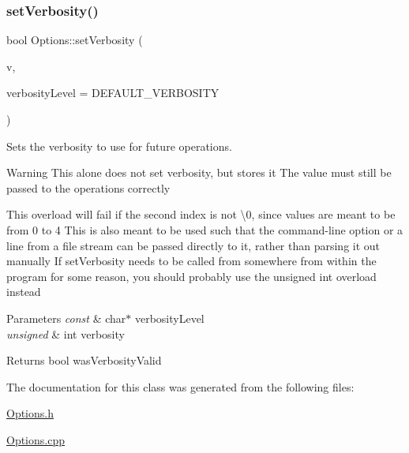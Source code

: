 \subsubsection{\texorpdfstring{setVerbosity()}{setVerbosity()}\hspace{0.1cm}{\footnotesize\ttfamily [4/4]}}
{\footnotesize\ttfamily bool Options\+::set\+Verbosity (\begin{DoxyParamCaption}\item[{const char $\ast$}]{v,  }\item[{unsigned int}]{verbosity\+Level = {\ttfamily DEFAULT\+\_\+VERBOSITY} }\end{DoxyParamCaption})}



Sets the verbosity to use for future operations. 

\begin{DoxyWarning}{Warning}
This alone does not set verbosity, but stores it The value must still be passed to the operations correctly

This overload will fail if the second index is not \textquotesingle{}\textbackslash{}0\textquotesingle{}, since values are meant to be from 0 to 4 This is also meant to be used such that the command-\/line option or a line from a file stream can be passed directly to it, rather than parsing it out manually If set\+Verbosity needs to be called from somewhere from within the program for some reason, you should probably use the unsigned int overload instead
\end{DoxyWarning}

\begin{DoxyParams}{Parameters}
{\em const} & char$\ast$ verbosity\+Level \\
\hline
{\em unsigned} & int verbosity\\
\hline
\end{DoxyParams}
\begin{DoxyReturn}{Returns}
bool was\+Verbosity\+Valid 
\end{DoxyReturn}


The documentation for this class was generated from the following files\+:\begin{DoxyCompactItemize}
\item 
\mbox{\hyperlink{Options_8h}{Options.\+h}}\item 
\mbox{\hyperlink{Options_8cpp}{Options.\+cpp}}\end{DoxyCompactItemize}

